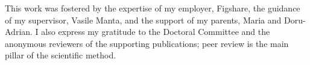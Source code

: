 \thispagestyle{empty}
\noindent This work was fostered by the expertise of my employer, Figshare, the guidance of my supervisor, Vasile Manta, and the support of my parents, Maria and Doru-Adrian. I also express my gratitude to the Doctoral Committee and the anonymous reviewers of the supporting publications; peer review is the main pillar of the scientific method.